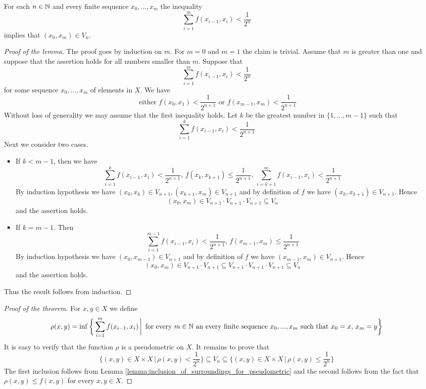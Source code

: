 \begin{lemma}\label{lemma:inclusion_of_surroundings_for_pseudometric}
For each $n \in {\mathbb N}$ and every finite sequence $x_0,...,x_m$ the inequality
$$\sum_{i=1}^mf(x_{i-1},x_i) < \frac{1}{2^n}$$
implies that $(x_0,x_m) \in V_n$.
\end{lemma}
\begin{proof}[Proof of the lemma]
The proof goes by induction on $m$. For $m = 0$ and $m = 1$ the claim is trivial. Assume that $m$ is greater than one and suppose that the assertion holds for all numbers smaller than $m$. Suppose that
$$\sum_{i=1}^mf(x_{i-1},x_i) < \frac{1}{2^n}$$
for some sequence $x_0,...,x_m$ of elements in $X$. We have
$$\mbox{ either }f(x_0,x_1) < \frac{1}{2^{n+1}}\mbox{ or }f(x_{m-1},x_m) < \frac{1}{2^{n+1}}$$
Without loss of generality we may assume that the first inequality holds. Let $k$ be the greatest number in $\{1,...,m-1\}$ such that
$$\sum_{i=1}^kf(x_{i-1},x_i) < \frac{1}{2^{n+1}}$$
Next we consider two cases.
\begin{itemize}
\item If $k < m-1$, then we have
$$\sum_{i=1}^{k}f(x_{i-1},x_i) < \frac{1}{2^{n+1}},\,f(x_k,x_{k+1}) \leq \frac{1}{2^{n+1}},\,\sum_{i=k+1}^mf(x_{i-1},x_i) < \frac{1}{2^{n+1}}$$
By induction hypothesis we have $(x_0,x_k)\in V_{n+1},(x_{k+1},x_m)\in V_{n+1}$ and by definition of $f$ we have $(x_k,x_{k+1})\in V_{n+1}$. Hence
$$(x_0,x_m) \in V_{n+1}\cdot V_{n+1}\cdot V_{n+1}\subseteq V_n$$
and the assertion holds.
\item If $k = m-1$. Then 
$$\sum_{i=1}^{m-1}f(x_{i-1},x_i) < \frac{1}{2^{n+1}},\,f(x_{m-1},x_m)\leq \frac{1}{2^{n+1}}$$
By induction hypothesis we have $(x_0,x_{m-1})\in V_{n+1}$ and by definition of $f$ we have $(x_{m-1},x_{m})\in V_{n+1}$. Hence
$$(x_0,x_{m}) \in V_{n+1}\cdot V_{n+1} \subseteq V_{n+1}\cdot V_{n+1}\cdot V_{n+1} \subseteq V_n$$
and the assertion holds.
\end{itemize}
Thus the result follows from induction.
\end{proof}

\begin{proof}[Proof of the theorem]
For $x,y\in X$ we define
$$\rho(x,y) = \inf \bigg\{\sum_{i=1}^mf(x_{i-1},x_i)\,\bigg|\,\mbox{ for every }m\in {\mathbb N}\mbox{ an every finite sequence }x_0,...,x_m\mbox{ such that }x_0 = x,\,x_m = y\bigg\}$$
It is easy to verify that the function $\rho$ is a pseudometric on $X$. It remains to prove that
$$\bigg\{(x,y)\in X\times X\,\bigg|\,\rho(x,y)<\frac{1}{2^n}\bigg\} \subseteq V_n \subseteq \bigg\{(x,y)\in X\times X\,\bigg|\,\rho(x,y) \leq \frac{1}{2^n}\bigg\}$$
The first inclusion follows from Lemma \ref{lemma:inclusion_of_surroundings_for_pseudometric} and the second follows from the fact that $\rho(x,y) \leq f(x,y)$ for every $x,y\in X$.
\end{proof}

